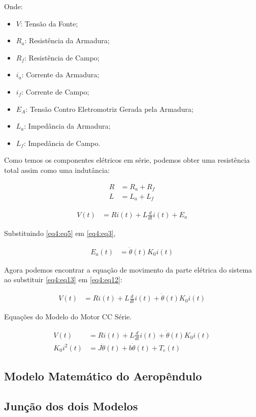 Onde:

\begin{itemize}
	\item $V$: Tensão da Fonte;
	\item $R_a$: Resistência da Armadura;
	\item $R_f$: Resistência de Campo;
	\item $i_a$: Corrente da Armadura;
	\item $i_f$: Corrente de Campo;
	\item $E_A$: Tensão Contro Eletromotriz Gerada pela Armadura;
	\item $L_a$: Impedância da Armadura;
	\item $L_f$: Impedância de Campo.
\end{itemize}

Como temos os componentes elétricos em série, podemos obter uma resistência total assim como uma indutância:

\begin{align}
	R &= R_a + R_f          \label{eq4:eq10}\\        
	L &= L_a + L_f          \label{eq4:eq11}
\end{align}


\begin{align}
	V(t) &= Ri(t)+ L\frac{d}{dt}i(t) + E_a \label{eq4:eq12}
\end{align}

Substituindo \ref{eq4:eq5} em \ref{eq4:eq3},

\begin{align}
	E_a(t) &= \dot{\theta}(t)K_0 i(t) \label{eq4:eq13}
\end{align}

Agora podemos encontrar a equação de movimento da parte elétrica do sistema ao substituir \ref{eq4:eq13} em \ref{eq4:eq12}:

\begin{align}
	V(t) &= Ri(t)+ L\frac{d}{dt}i(t) + \dot{\theta}(t)K_0 i(t) \label{eq4:eq14}
\end{align}

Equações do Modelo do Motor CC Série.

\begin{align}
	V(t) &= Ri(t)+ L\frac{d}{dt}i(t) + \dot{\theta}(t)K_0 i(t) \label{eq4:eq15}\\
	K_0 i^2(t) &= J\ddot{\theta}(t) + b\dot{\theta}(t) + T_c(t) \label{eq4:eq16}
\end{align}



\subsection{ Modelo Matemático do Aeropêndulo}




\subsection{Junção dos dois Modelos}